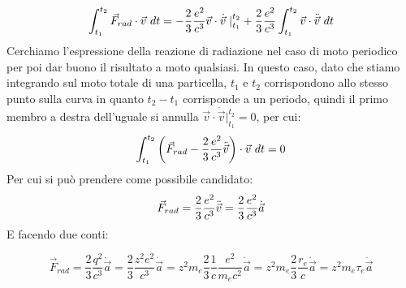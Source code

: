 \documentclass[twoside]{article}
\begin{document}
\begin{equation}
    \int_{t_1}^{t_2}\vec{F}_{rad}\cdot\vec{v} \ dt=-\frac{2}{3}\frac{e^2}{c^3}\vec{v}\cdot \dot{\vec{v}}\left. \right|_{t_1}^{t_2}+\frac{2}{3}\frac{e^2}{c^3}\int_{t_1}^{t_2}\vec{v}\cdot \Ddot{\vec{v}}\ dt
\end{equation}
Cerchiamo l'espressione della reazione di radiazione nel caso di moto periodico per poi dar buono il risultato a moto qualsiasi. In questo caso, dato che stiamo integrando sul moto totale di una particella, $t_1$ e $t_2$ corrispondono allo stesso punto sulla curva in quanto $t_2-t_1$ corrisponde a un periodo, quindi il primo membro a destra dell'uguale si annulla $\vec{v}\cdot \dot{\vec{v}}\left. \right|_{t_1}^{t_2}=0$, per cui:
\begin{equation}
    \int_{t_1}^{t_2}\left( \vec{F}_{rad}-\frac{2}{3}\frac{e^2}{c^3}\Ddot{\vec{v}} \right)\cdot \vec{v} \ dt=0
\end{equation}
Per cui si può prendere come possibile candidato:
\begin{equation}
    \vec{F}_{rad}=\frac{2}{3}\frac{e^2}{c^3}\Ddot{\vec{v}}=\frac{2}{3}\frac{e^2}{c^3}\dot{\vec{a}}
\end{equation}
E facendo due conti:

\begin{equation}
\vec{F}_{rad}=\frac{2}{3}\frac{q^2}{c^3} \dot{\vec{a}}=\frac{2}{3}\frac{z^2 e^2}{c^3}\dot{\vec{a}}=z^2 m_e \frac{2}{3}\frac{1}{c}\frac{e^2}{m_e c^2} \dot{\vec{a}}=z^2 m_e \frac{2}{3}\frac{r_e}{c} \dot{\vec{a}}=z^2 m_e \tau_e \dot{\vec{a}}
\end{equation}
\end{document}
